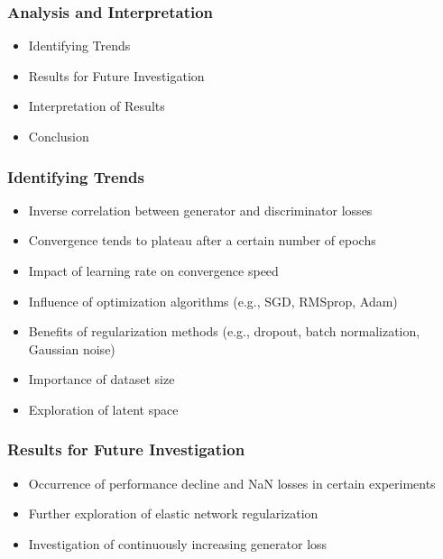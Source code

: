 \begin{frame}
    \frametitle{Analysis and Interpretation}
    
    \begin{itemize}
        \item Identifying Trends
        \item Results for Future Investigation
        \item Interpretation of Results
        \item Conclusion
    \end{itemize}
    
\end{frame}

\begin{frame}
    \frametitle{Identifying Trends}

    \begin{itemize}
        \item Inverse correlation between generator and discriminator losses
        \item Convergence tends to plateau after a certain number of epochs
        \item Impact of learning rate on convergence speed
        \item Influence of optimization algorithms (e.g., SGD, RMSprop, Adam)
        \item Benefits of regularization methods (e.g., dropout, batch normalization, Gaussian noise)
        \item Importance of dataset size
        \item Exploration of latent space
    \end{itemize}
    
\end{frame}

\begin{frame}
    \frametitle{Results for Future Investigation}

    \begin{itemize}
        \item Occurrence of performance decline and NaN losses in certain experiments
        \item Further exploration of elastic network regularization
        \item Investigation of continuously increasing generator loss
    \end{itemize}
    
\end{frame}

